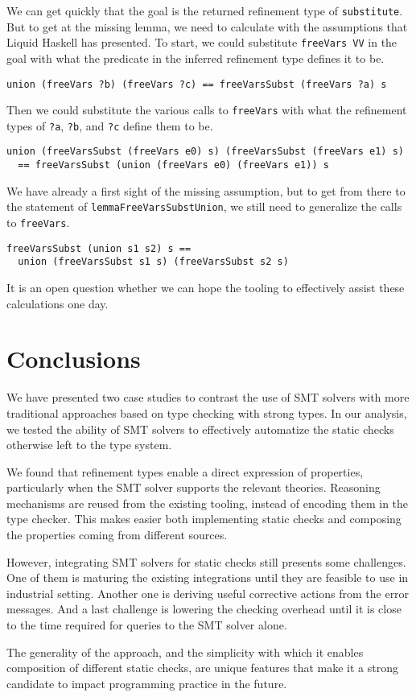 \documentclass[sigconf, anonymous, review]{acmart}
\newcommand{\tc}[1]{{\small\texttt{#1}}}
\begin{document}
We can get quickly that the goal is the returned refinement type of \tc{substitute}.
But to get at the missing lemma, we need to calculate with the assumptions that
Liquid Haskell has presented.
To start, we could substitute \tc{freeVars VV} in the goal with what the predicate
in the inferred refinement type defines it to be.

\begin{verbatim}
union (freeVars ?b) (freeVars ?c) == freeVarsSubst (freeVars ?a) s
\end{verbatim}

Then we could substitute the various calls to \tc{freeVars} with what
the refinement types of \tc{?a}, \tc{?b}, and \tc{?c} define them to be.

\begin{verbatim}
union (freeVarsSubst (freeVars e0) s) (freeVarsSubst (freeVars e1) s)
  == freeVarsSubst (union (freeVars e0) (freeVars e1)) s
\end{verbatim}

We have already a first sight of the missing assumption, but to get from
there to the statement of \tc{lemmaFreeVarsSubstUnion}, we still need
to generalize the calls to \tc{freeVars}.

\begin{verbatim}
freeVarsSubst (union s1 s2) s ==
  union (freeVarsSubst s1 s) (freeVarsSubst s2 s)
\end{verbatim}

It is an open question whether we can hope the tooling to effectively
assist these calculations one day.


\section{Conclusions}
\label{conclusions}

We have presented two case studies to contrast the use of SMT solvers
with more traditional approaches based on type checking with strong types. In
our analysis, we tested the ability of SMT solvers to effectively automatize
the static checks otherwise left to the type system.

We found that refinement types enable a direct expression of properties,
particularly when the SMT solver supports the relevant theories. Reasoning
mechanisms are reused from the existing tooling, instead of encoding them
in the type checker. This makes easier both implementing static checks and
composing the properties coming from different sources.

However, integrating SMT solvers for static checks still presents some
challenges. One of them is maturing the existing integrations until they are
feasible to use in industrial setting. Another one is deriving useful
corrective actions from the error messages. And a last challenge is lowering
the checking overhead until it is close to the time required for queries to
the SMT solver alone.

The generality of the approach, and the simplicity with which it enables
composition of different static checks, are unique features that make it a strong
candidate to impact programming practice in the future.



\end{document}

